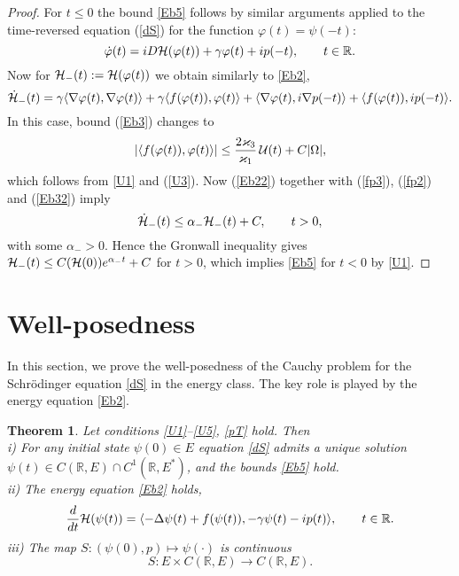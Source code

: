 \documentclass[11pt]{article}
\newtheorem{theorem}{Theorem}[section]
\newcommand{\fr}{\frac}
\newcommand{\R}{{\mathbb R}}
\newcommand{\cH}{{\cal H}}
\newcommand{\al}{\alpha}
\newcommand{\vp}{\varphi}
\newcommand{\De}{\Delta}
\newcommand{\vka}{\varkappa}
\newcommand{\ga}{\gamma}
\newcommand{\na}{\nabla}
\newcommand{\5}{{\hspace{0.5mm}}}
\numberwithin{equation}{section}
\newcommand{\la}{\label}
\newcommand{\be}{\begin{equation}}
\newcommand{\ee}{\end{equation}}
\newcommand{\bt}{\begin{theorem}}
\newcommand{\et}{\end{theorem}}
\numberwithin{equation}{section}
\begin{document}
\begin{proof}
For $t\le 0$ the bound \eqref{Eb5} follows by similar arguments applied to the
time-reversed equation (\ref{dS}) for the function $\vp(t)=\psi(-t)$:
\be\la{dSHf2}
\dot\vp(t)=iD\cH(\vp(t))+\ga\vp(t)+ip(- t),\qquad t\in\R.
\ee
Now for $\cH_-(t):=\cH(\vp(t))$ we obtain similarly to \eqref{Eb2},
 \be\la{Eb22}
\dot\cH_- (t)=
\ga\langle \na \vp(t),\na\vp(t)\rangle+\ga\langle f(\vp(t)), \vp(t)\rangle
+\langle \na \vp(t),i\na p(-t)\rangle+\langle f(\vp(t)), ip(- t)\rangle.
\ee
In this case,  bound (\ref{Eb3}) changes to
\be\la{Eb32}
|\langle f(\vp(t)), \vp(t)\rangle|\le \frac{2\vka_3}{\vka_1}\,{\cal U}(t)+C|\Omega|,
\ee
which follows from \eqref{U1} and (\ref{U3}). Now (\ref{Eb22}) together with (\ref{fp3}), (\ref{fp2}) and (\ref{Eb32}) imply
\be\la{dcH2}
\dot\cH_- (t) \le \al_-\cH_- (t)+C,\qquad t>0,
\ee
with some $\al_->0$. Hence the Gronwall inequality gives
$
\cH_- (t)\le C(\cH(0))e^{\al_- t}+C$ for $t>0$, 
which implies \eqref{Eb5} for $t< 0$ by \eqref{U1}.
\end{proof}



\section{Well-posedness }\la{s3}
In this section, we prove the 
well-posedness of the Cauchy problem for the Schr\"odinger equation \eqref{dS} in the energy class. The key role is played by the energy equation \eqref{Eb2}.

\bt\la{pwp}
Let conditions \eqref{U1}--\eqref{U5}, \eqref{pT} hold. Then
 \smallskip\\
 {\rm i)} For any initial state $\psi(0)\in E$ equation \eqref{dS} admits a unique solution
$\psi(t)\in C(\R,E)\cap C^1(\R, E^*)$, and the bounds \eqref{Eb5} hold.
\smallskip\\
 {\rm ii)} The energy equation \eqref{Eb2} holds,
 \be\la{ebal2}
\fr d{dt}\cH (\psi(t))=\langle - \De \psi(t)+f(\psi(t)),-\ga \psi(t)-i p( t)\rangle,\qquad t\in\R.
\ee
{\rm iii)} The map $S:(\psi(0),p)\mapsto \psi(\cdot)$ is continuous
\be\la{W}
 S: E\times C(\R,E)\to C(\R,E).
 \ee
 
 \et
\end{document}
